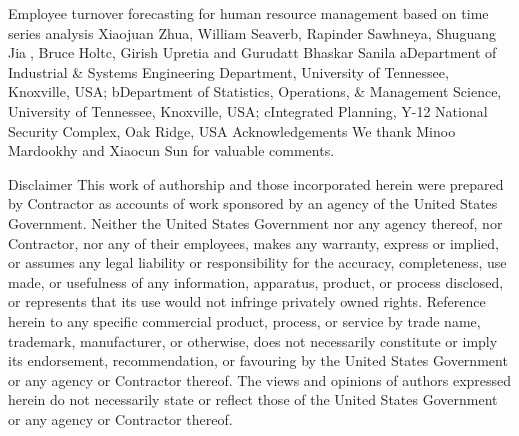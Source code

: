 Employee turnover forecasting for human resource management based on time series analysis
Xiaojuan Zhua, William Seaverb, Rapinder Sawhneya, Shuguang Jia, Bruce Holtc, Girish Upretia and Gurudatt Bhaskar Sanila
aDepartment of Industrial & Systems Engineering Department, University of Tennessee, Knoxville, USA; bDepartment of Statistics, Operations, & Management Science, University of Tennessee, Knoxville, USA; cIntegrated Planning, Y-12 National Security Complex, Oak Ridge, USA
Acknowledgements
We thank Minoo Mardookhy and Xiaocun Sun for valuable comments.

Disclaimer
This work of authorship and those incorporated herein were prepared by Contractor as accounts of work sponsored by an agency of the United States Government. Neither the United States Government nor any agency thereof, nor Contractor, nor any of their employees, makes any warranty, express or implied, or assumes any legal liability or responsibility for the accuracy, completeness, use made, or usefulness of any information, apparatus, product, or process disclosed, or represents that its use would not infringe privately owned rights. Reference herein to any specific commercial product, process, or service by trade name, trademark, manufacturer, or otherwise, does not necessarily constitute or imply its endorsement, recommendation, or favouring by the United States Government or any agency or Contractor thereof. The views and opinions of authors expressed herein do not necessarily state or reflect those of the United States Government or any agency or Contractor thereof. 

